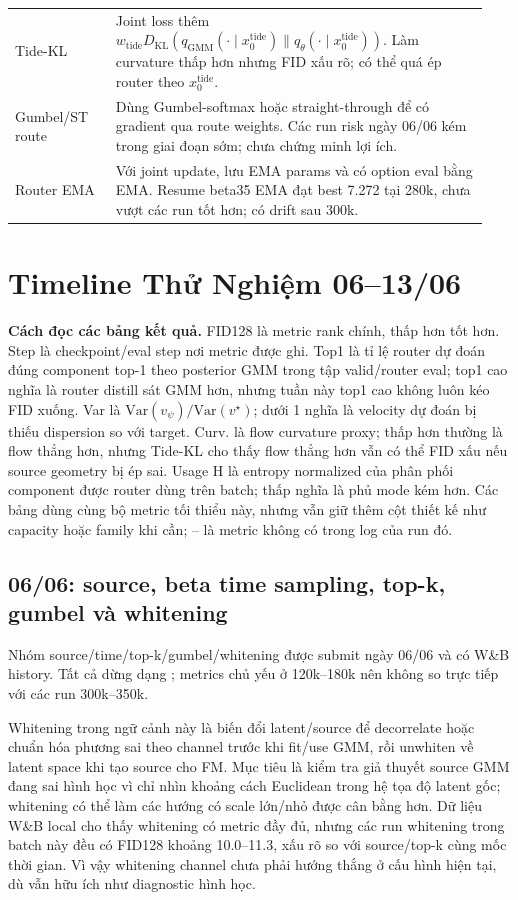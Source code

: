 \documentclass[11pt,a4paper]{article}
\newcommand{\kl}{D_{\mathrm{KL}}}
\newcommand{\metric}[1]{\texttt{\small\detokenize{#1}}}
\newcommand{\na}{--}
\begin{document}
\begin{longtable}{@{}p{0.20\linewidth} p{0.74\linewidth}@{}}
\addlinespace
Tide-KL & Joint loss thêm \(w_{\mathrm{tide}}\kl(q_{\mathrm{GMM}}(\cdot\mid x_0^{\mathrm{tide}})\|q_\theta(\cdot\mid x_0^{\mathrm{tide}}))\). Làm curvature thấp hơn nhưng FID xấu rõ; có thể quá ép router theo \(x_0^{\mathrm{tide}}\).\\
\addlinespace
Gumbel/ST route & Dùng Gumbel-softmax hoặc straight-through để có gradient qua route weights. Các run risk ngày 06/06 kém trong giai đoạn sớm; chưa chứng minh lợi ích.\\
\addlinespace
Router EMA & Với joint update, lưu EMA params và có option eval bằng EMA. Resume beta35 EMA đạt best 7.272 tại 280k, chưa vượt các run tốt hơn; có drift sau 300k.\\
\bottomrule
\end{longtable}
\normalsize

\section{Timeline Thử Nghiệm 06--13/06}

\textbf{Cách đọc các bảng kết quả.} FID128 là metric rank chính, thấp hơn tốt hơn. Step là checkpoint/eval step nơi metric được ghi. Top1 là tỉ lệ router dự đoán đúng component top-1 theo posterior GMM trong tập valid/router eval; top1 cao nghĩa là router distill sát GMM hơn, nhưng tuần này top1 cao không luôn kéo FID xuống. Var là \(\mathrm{Var}(v_\psi)/\mathrm{Var}(v^\star)\); dưới 1 nghĩa là velocity dự đoán bị thiếu dispersion so với target. Curv. là flow curvature proxy; thấp hơn thường là flow thẳng hơn, nhưng Tide-KL cho thấy flow thẳng hơn vẫn có thể FID xấu nếu source geometry bị ép sai. Usage H là entropy normalized của phân phối component được router dùng trên batch; thấp nghĩa là phủ mode kém hơn. Các bảng dùng cùng bộ metric tối thiểu này, nhưng vẫn giữ thêm cột thiết kế như capacity hoặc family khi cần; \na{} là metric không có trong log của run đó.

\subsection{06/06: source, beta time sampling, top-k, gumbel và whitening}

Nhóm source/time/top-k/gumbel/whitening được submit ngày 06/06 và có W\&B history. Tất cả dừng dạng \metric{CANCEL\_ACKNOWLEDGED}; metrics chủ yếu ở 120k--180k nên không so trực tiếp với các run 300k--350k.

Whitening trong ngữ cảnh này là biến đổi latent/source để decorrelate hoặc chuẩn hóa phương sai theo channel trước khi fit/use GMM, rồi unwhiten về latent space khi tạo source cho FM. Mục tiêu là kiểm tra giả thuyết source GMM đang sai hình học vì chỉ nhìn khoảng cách Euclidean trong hệ tọa độ latent gốc; whitening có thể làm các hướng có scale lớn/nhỏ được cân bằng hơn. Dữ liệu W\&B local cho thấy whitening có metric đầy đủ, nhưng các run whitening trong batch này đều có FID128 khoảng 10.0--11.3, xấu rõ so với source/top-k cùng mốc thời gian. Vì vậy whitening channel chưa phải hướng thắng ở cấu hình hiện tại, dù vẫn hữu ích như diagnostic hình học.
\end{document}
